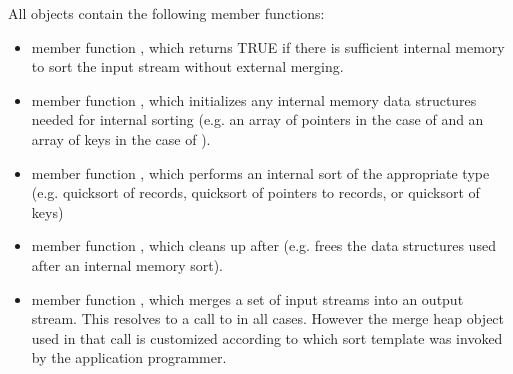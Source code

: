 All  objects contain the following
member functions:
\begin{itemize}
    \item member function ,
    which returns TRUE if there is sufficient internal
    memory to sort the input stream without external
    merging.
    
    \item member function ,
    which initializes any internal memory data structures
    needed for internal sorting (e.g. an array of pointers
    in the case of  and an array of keys
    in the case of ).
    
    \item member function , which
    performs an internal sort of the appropriate type (e.g.
    quicksort of records, quicksort of pointers to records,
    or quicksort of keys)
    
    \item member function ,
    which cleans up after  (e.g.
    frees the data structures used after an internal memory
    sort).
    
    \item member function , which merges
    a set of input streams into an output stream. This
    resolves to a call to  in
    all cases. However the merge heap object used in that
    call is customized according to which sort template was
    invoked by the application programmer.

\end{itemize}

